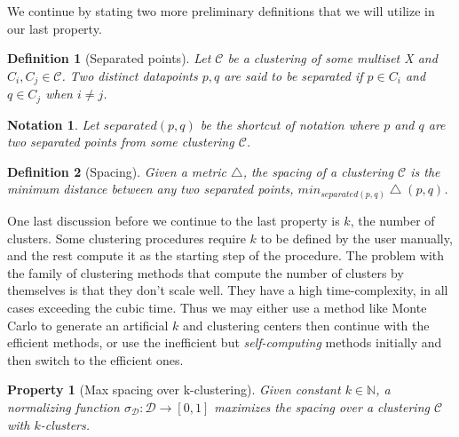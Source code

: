 \documentclass{article}
\newtheorem{definition}{Definition}
\newtheorem{property}{Property}
\newtheorem{notation}{Notation}
\newcommand{\nat}{\mathbb{N}}   %
\newcommand{\dataset}{\mathcal{D}}   %
\newcommand{\clusterset}{\mathcal{C}}   %
\begin{document}
We continue by stating two more preliminary definitions that we will utilize in our last property. 


\begin{definition} [Separated points] 
Let $\clusterset$ be a clustering of some multiset X and $C_i, C_j \in \clusterset$. Two distinct datapoints $p, q$ are said to be separated if $p \in C_i$ and  $q \in C_j$ when $i \neq j$. 
\end{definition}

\begin{notation} 
Let $separated(p,q)$ be the shortcut of notation where $p$ and $q$ are two separated points from some clustering $\clusterset$.
\end{notation}

\begin{definition} [Spacing] 
Given a metric $\bigtriangleup$, the spacing of a clustering $\clusterset$ is the minimum distance between any two separated points,
$min_{separated (p,q)}\bigtriangleup(p,q)$.
\end{definition}

One last discussion before we continue to the last property is $k$, the number of clusters. Some clustering procedures require $k$ to be defined by the user manually, and the rest compute it as the starting step of the procedure. The problem with the family of clustering methods that compute the number of clusters by themselves is that they don't scale well. They have a high time-complexity, in all cases exceeding the cubic time. Thus we may either use a method like Monte Carlo to generate an artificial $k$ and clustering centers then continue with the efficient methods, or use the inefficient but \textit{self-computing} methods initially and then switch to the efficient ones.


\begin{property} [Max spacing over k-clustering]  Given constant $k \in \nat$, a normalizing function $\sigma_{\dataset}: \dataset  \rightarrow  [0,1]$  maximizes the spacing over a clustering $\clusterset$ with $k$-clusters.
\end{property}





\end{document}
